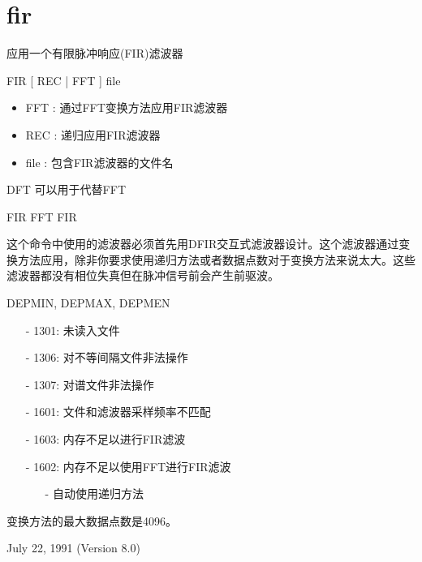 \section{fir}
\label{cmd:fir}

应用一个有限脉冲响应(FIR)滤波器

FIR [ REC | FFT ] file

\begin{itemize}
\item FFT : 通过FFT变换方法应用FIR滤波器
\item REC : 递归应用FIR滤波器
\item file : 包含FIR滤波器的文件名
\end{itemize}
 
DFT 可以用于代替FFT

FIR FFT FIR

这个命令中使用的滤波器必须首先用DFIR交互式滤波器设计。这个滤波器通过变换方法应用，除非你要求使用递归方法或者数据点数对于变换方法来说太大。这些滤波器都没有相位失真但在脉冲信号前会产生前驱波。

DEPMIN, DEPMAX, DEPMEN

\begin{itemize}
\item[-]1301: 未读入文件
\item[-]1306: 对不等间隔文件非法操作
\item[-]1307: 对谱文件非法操作
\item[-]1601: 文件和滤波器采样频率不匹配
\item[-]1603: 内存不足以进行FIR滤波
\end{itemize}

\begin{itemize}
\item[-]1602: 内存不足以使用FFT进行FIR滤波
	\begin{itemize}
	\item[-]自动使用递归方法
	\end{itemize}
\end{itemize}

变换方法的最大数据点数是4096。

July 22, 1991 (Version 8.0)
